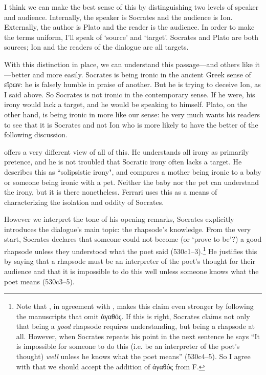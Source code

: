 \documentclass[11pt,letterpaper]{article}
\begin{document}
I think we can make the best sense of this by distinguishing two levels of speaker and audience. Internally, the speaker is Socrates and the audience is Ion. Externally, the author is Plato and the reader is the audience. In order to make the terms uniform, I'll speak of `source' and `target'. Socrates and Plato are both sources; Ion and the readers of the dialogue are all targets.

With this distinction in place, we can understand this passage---and others like it---better and more easily. Socrates is being ironic in the ancient Greek sense of \textgreek{εἴρων}: he is falsely humble in praise of another. But he is trying to deceive Ion, as I said above. So Socrates is not ironic in the contemporary sense. If he were, his irony would lack a target, and he would be speaking to himself. Plato, on the other hand, is being ironic in more like our sense: he very much wants his readers to see that it is Socrates and not Ion who is more likely to have the better of the following discussion.

\textcite{ferrari2008} offers a very different view of all of this. He understands all irony as primarily pretence, and he is not troubled that Socratic irony often lacks a target. He describes this as ``solipsistic irony", and compares a mother being ironic to a baby or someone being ironic with a pet. Neither the baby nor the pet can understand the irony, but it is there nonetheless. Ferrari uses this as a means of characterizing the isolation and oddity of Socrates.

However we interpret the tone of his opening remarks, Socrates explicitly introduces the dialogue's main topic: the rhapsode's knowledge. From the very start, Socrates declares that someone could not become (or `prove to be'?) a good rhapsode unless they understood what the poet said (530c1--3).\footnote{Note that \textcite{canto2001}, in agreement with \textcite{meridier1931}, makes this claim even stronger by following the manuscripts that omit \textgreek{ἀγαθός}. If this is right, Socrates claims not only that being a \emph{good} rhapsode requires understanding, but being a rhapsode at all. However, when Socrates repeats his point in the next sentence he says ``It is impossible for someone to do this (i.e. be an interpreter of the poet's thought) \emph{well} unless he knows what the poet means'' (530c4--5). So I agree with \textcite{burnet1903} that we should accept the addition of \textgreek{ἀγαθός} from F.} He justifies this by saying that a rhapsode must be an interpreter of the poet's thought for their audience and that it is impossible to do this well unless someone knows what the poet means (530c3--5).
\end{document}
